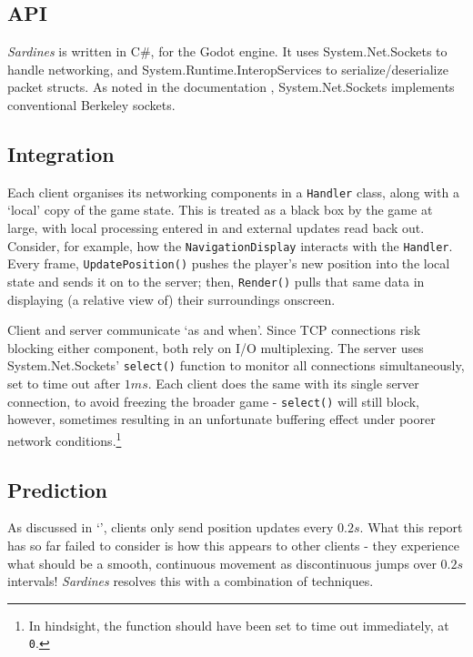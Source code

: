 \documentclass[a4paper, 9pt]{article}
\begin{document}
\begin{flushleft}
\subsection*{API}

\textit{Sardines} is written in C\#, for the Godot engine. It uses System.Net.Sockets to handle networking, and System.Runtime.InteropServices to serialize/deserialize packet structs. As noted in the documentation \citeyearpar{msftSNS}, System.Net.Sockets implements conventional Berkeley sockets.

\subsection*{Integration}

Each client organises its networking components in a \texttt{Handler} class, along with a `local' copy of the game state. This is treated as a black box by the game at large, with local processing entered in and external updates read back out. Consider, for example, how the \texttt{NavigationDisplay} interacts with the \texttt{Handler}. Every frame, \texttt{UpdatePosition()} pushes the player's new position into the local state and sends it on to the server; then, \texttt{Render()} pulls that same data in displaying (a relative view of) their surroundings onscreen.

\vspace{5pt}\noindent
Client and server communicate `as and when'. Since TCP connections risk blocking either component, both rely on I/O multiplexing. The server uses System.Net.Sockets' \texttt{select()} function to monitor all connections simultaneously, set to time out after $1ms$. Each client does the same with its single server connection, to avoid freezing the broader game - \texttt{select()} will still block, however, sometimes resulting in an unfortunate buffering effect under poorer network conditions.\footnote{In hindsight, the function should have been set to time out immediately, at \texttt{0}.}

\subsection*{Prediction}\label{Prediction}

As discussed in `',  clients only send position updates every $0.2s$. What this report has so far failed to consider is how this appears to other clients - they experience what should be a smooth, continuous movement as discontinuous jumps over $0.2s$ intervals! \textit{Sardines} resolves this with a combination of techniques.


\end{flushleft}
\end{document}
